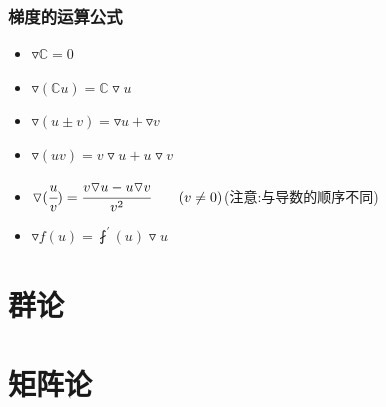 \documentclass[UTF8,12pt]{ctexbook}
\newcommand{\derivative}{^\prime}
\newcommand{\fDerivative}[1]{\fint\derivative(#1)}
\newcommand{\defFunction}[1]{f(#1)}
\newcommand{\mathConstant}{\mathbb{C}}
\begin{document}
{{{    \subsubsection{梯度的运算公式}{
      \begin{itemize}
        \item $\triangledown \mathConstant = 0$
        \item $\triangledown (\mathConstant u) = \mathConstant \triangledown u$
        \item $\triangledown (u \pm v) = \triangledown u + \triangledown v$
        \item $\triangledown (uv) = v\triangledown u + u\triangledown v$
        \item $\triangledown (\cfrac{u}{v}) = \cfrac{v\triangledown u - u\triangledown v}{v^2}\qquad (v \neq 0)$(注意:与导数的顺序不同)
        \item $\triangledown \defFunction{u} = \fDerivative{u}\triangledown u$
      \end{itemize}
    }%

  }%

 }%

\section{群论}{

 }%

\section{矩阵论}{

 }%

}%
\end{document}

